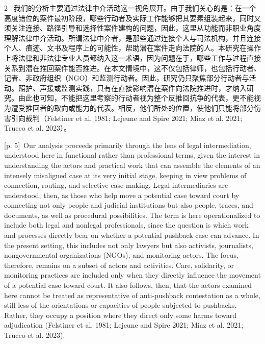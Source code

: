 \documentclass[10pt,a4paper]{article}
\begin{document}
\begin{paracol}{2}
\switchcolumn*
{\scriptsize\color{gray} [p. 5]}\ 我们的分析主要通过法律中介活动这一视角展开。由于我们关心的是：在一个高度错位的案件最初阶段，哪些行动者及实际工作能够把其要素组装起来，同时又须关注连接、路径引导和选择性案件建构的问题，因此，这里从功能而非职业角度理解法律中介活动。所谓法律中介者，是那些通过连接个人与司法机构，并且连接个人、痕迹、文书及程序上的可能性，帮助潜在案件走向法院的人。本研究在操作上将法律和非法律专业人员都纳入这一术语，因为问题在于，哪些工作与过程直接关系到潜在推回案件能否推进。在本文情境中，这不仅包括律师，也包括行动者、记者、非政府组织（NGO）和监测行动者。因此，研究仍只聚焦部分行动者与活动。照护、声援或监测实践，只有在直接影响潜在案件向法院推进时，才纳入研究。由此也可知，不能把这里考察的行动者视为整个反推回抗争的代表，更不能视为遭受推回者的取向或能力的代表。相反，他们所处的位置，使他们只能将部分伤害引向裁判（Felstiner et al. 1981; Lejeune and Spire 2021; Miaz et al. 2021; Trucco et al. 2023）。\par
\switchcolumn
{\scriptsize\color{gray} [p. 5]}\ Our analysis proceeds primarily through the lens of legal intermediation, understood here in functional rather than professional terms, given the interest in understanding the actors and practical work that can assemble the elements of an intensely misaligned case at its very initial stage, keeping in view problems of connection, routing, and selective case-making. Legal intermediaries are understood, then, as those who help move a potential case toward court by connecting not only people and judicial institutions but also people, traces, and documents, as well as procedural possibilities. The term is here operationalized to include both legal and nonlegal professionals, since the question is which work and processes directly bear on whether a potential pushback case can advance. In the present setting, this includes not only lawyers but also activists, journalists, nongovernmental organizations (NGOs), and monitoring actors. The focus, therefore, remains on a subset of actors and activities. Care, solidarity, or monitoring practices are included only when they directly influence the movement of a potential case toward court. It also follows, then, that the actors examined here cannot be treated as representative of anti-pushback contestation as a whole, still less of the orientations or capacities of people subjected to pushbacks. Rather, they occupy a position where they direct only some harms toward adjudication (Felstiner et al. 1981; Lejeune and Spire 2021; Miaz et al. 2021; Trucco et al. 2023).\par
\switchcolumn*

\end{paracol}
\end{document}
